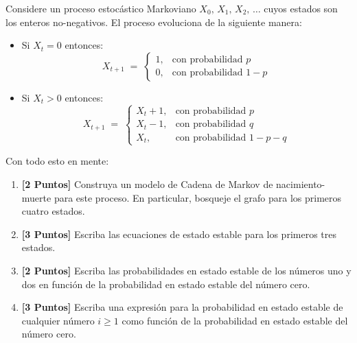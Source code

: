 \documentclass[ a4paper, twoside, 11pt]{article}
\begin{document}
\begin{problem}
Considere un proceso estoc\'astico Markoviano $X_0, \, X_1, \, X_2,\, \dots$ cuyos estados son los enteros no-negativos. El proceso evoluciona de la siguiente manera: 
\begin{itemize}
\item Si $X_t = 0$ entonces: 
\[
X_{t+1} \; = \; 
\begin{cases}
1, & \text{con probabilidad } p \\
0, & \text{con probabilidad } 1-p 
\end{cases}
\]
\item Si $X_t > 0$ entonces: 
\[
X_{t+1} \; = \; 
\begin{cases}
X_t + 1, & \text{con probabilidad } p \\
X_t - 1, & \text{con probabilidad } q \\
X_t, & \text{con probabilidad } 1-p-q
\end{cases}
\]
\end{itemize}

Con todo esto en mente: 
\begin{enumerate}[label=\alph*.]
\item \textbf{[2 Puntos]} Construya un modelo de Cadena de Markov de nacimiento-muerte para este proceso. En particular, bosqueje el grafo para los primeros cuatro estados. 
\item \textbf{[3 Puntos]} Escriba las ecuaciones de estado estable para los primeros tres estados. 
\item \textbf{[2 Puntos]} Escriba las probabilidades en estado estable de los n\'umeros uno y dos en funci\'on de la probabilidad en estado estable del n\'umero cero. 
\item \textbf{[3 Puntos]} Escriba una expresi\'on para la probabilidad en estado estable de cualquier n\'umero $i \geq 1$ como funci\'on de la probabilidad en estado estable del n\'umero cero. 
\end{enumerate}

\end{problem}
\vspace{\baselineskip}
\end{document}
